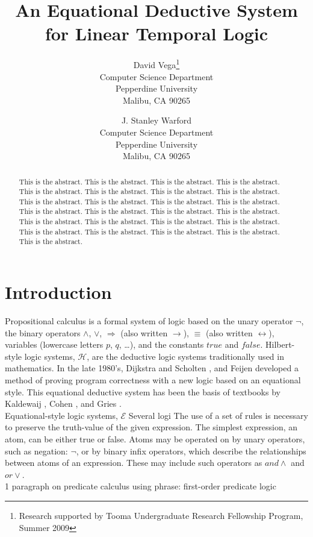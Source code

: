 \documentclass[fleqn, leqno]{article}
\title{An Equational Deductive System\\for Linear Temporal Logic}
\author{David Vega\thanks{Research supported by Tooma Undergraduate Research Fellowship Program, Summer 2009}\\
   Computer Science Department\\
   Pepperdine University\\
   Malibu, CA 90265
   \and
   J. Stanley Warford\\
   Computer Science Department\\
   Pepperdine University\\
   Malibu, CA 90265}
\date{} %
\newcommand{\impl}{\ensuremath{\Rightarrow}}        %
\begin{document}
\maketitle
\begin{abstract}
This is the abstract. This is the abstract. This is the abstract. This is the abstract. This is the abstract.
This is the abstract. This is the abstract. This is the abstract. This is the abstract. This is the abstract. 
This is the abstract. This is the abstract. This is the abstract. This is the abstract. This is the abstract. 
This is the abstract. This is the abstract. This is the abstract. This is the abstract. This is the abstract. 
This is the abstract. This is the abstract. This is the abstract. This is the abstract. This is the abstract. 
\end{abstract}

\thispagestyle{plain}

\section{Introduction}

Propositional calculus is a formal system of logic based on the unary operator $\lnot$, the binary operators $\land$, $\lor$, $\impl$
(also written $\rightarrow$),  $\equiv$ (also written $\leftrightarrow$), variables (lowercase letters $p$, $q$, \dots), and the
constants $true$ and $false$.
Hilbert-style logic systems, $\mathcal{H}$, are the deductive logic systems traditionally used in mathematics.
In the late 1980's, Dijkstra and Scholten \cite{DandS}, and Feijen \cite{Feij} developed a method of proving
program correctness with a new logic based on an equational style.
This equational deductive system has been the basis of textbooks by Kaldewaij \cite{Kald}, Cohen \cite{Cohen}, and Gries \cite{LADM}.\\

Equational-style logic systems, $\mathcal{E}$
Several logi
The use of a set of rules is necessary to preserve the truth-value of the given expression.
The simplest expression, an atom, can be either true or false. 
Atoms may be operated on by unary operators, such as negation: $\lnot$, or by binary infix operators, which describe the relationships between atoms of an expression.
These may include such operators as $and \land$ and $or \lor$.\\

1 paragraph on predicate calculus using phrase: first-order predicate logic\\
\end{document}
